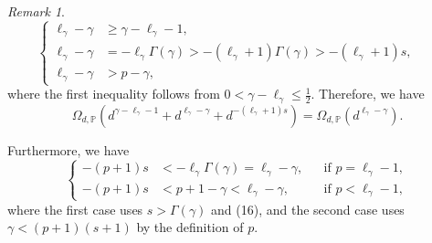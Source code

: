 \documentclass{article}
\theoremstyle{plain}
\theoremstyle{definition}
\theoremstyle{remark}
\newtheorem{remark}[theorem]{Remark}
\begin{document}
\begin{appendix}
\begin{remark}
$$
\left\{
\begin{aligned}
\ell_{\gamma} - \gamma
&\ge \gamma - \ell_{\gamma} - 1,
&&\\[4pt]
\ell_{\gamma} - \gamma
&= -\ell_{\gamma}\Gamma(\gamma)
   > -(\ell_{\gamma}+1)\Gamma(\gamma)
   > -(\ell_{\gamma}+1)s,\\[4pt]
\ell_{\gamma} - \gamma
&> p - \gamma,
\end{aligned}\right.
$$
where the first inequality follows from $0 < \gamma - \ell_{\gamma} \le \tfrac{1}{2}$. 
Therefore, we have 
$$\Omega_{d, \mathbb{P}} \left( 
d^{\gamma - \ell_{\gamma} - 1}
+ d^{\ell_{\gamma} - \gamma}
+ d^{-(\ell_{\gamma} + 1)  s}
\right)
=
\Omega_{d, \mathbb{P}} \left( 
d^{\ell_{\gamma} - \gamma}
\right). 
$$

Furthermore, we have
$$
\left\{
\begin{aligned}
-(p+1)s 
&< -\ell_{\gamma}\Gamma(\gamma) = \ell_{\gamma} - \gamma, 
&& \text{if } p = \ell_{\gamma} - 1,\\
-(p+1)s 
&< p+1-\gamma < \ell_{\gamma} - \gamma,
&& \text{if } p < \ell_{\gamma} - 1, 
\end{aligned}
\right.
$$
where the first case uses $s>\Gamma(\gamma)$ and (16), and the second case uses $\gamma < (p+1)(s+1)$ by the definition of $p$. 



\end{remark}
\end{appendix}
\end{document}
